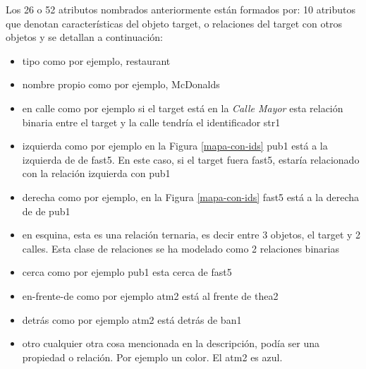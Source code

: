Los 26 o 52 atributos nombrados anteriormente est\'an formados por:
10 atributos que denotan caracter\'isticas del objeto target, o relaciones del target con otros objetos y se detallan a continuaci\'on:
\begin{itemize}
  \item tipo como por ejemplo, restaurant\\[-2.2em]
  \item nombre propio como por ejemplo, McDonalds\\[-2.2em]
  \item en calle como por ejemplo si el target est\'a en la {\it Calle Mayor} esta relaci\'on binaria entre el target y la calle tendr\'ia el identificador str1\\[-2.2em]
  \item izquierda como por ejemplo en la Figura \ref{mapa-con-ids} pub1 est\'a a la izquierda de de fast5. En este caso, si el target fuera fast5, estar\'ia relacionado con la relaci\'on izquierda con pub1\\[-2.2em]
  \item derecha como por ejemplo, en la Figura \ref{mapa-con-ids} fast5 est\'a a la derecha de de pub1\\[-2.2em]
  \item en esquina, esta es una relaci\'on ternaria, es decir entre 3 objetos, el target y 2 calles. Esta clase de relaciones se ha modelado como 2 relaciones binarias\\[-2.2em]    
  \item cerca como por ejemplo pub1 esta cerca de fast5\\[-2.2em]
  \item en-frente-de como por ejemplo atm2 est\'a al frente de thea2\\[-2.2em]
  \item detr\'as como por ejemplo atm2 est\'a detr\'as de ban1\\[-2.2em]
  \item otro cualquier otra cosa mencionada en la descripci\'on, pod\'ia ser una propiedad o relaci\'on. Por ejemplo un color. El atm2 es azul.
\end{itemize}

